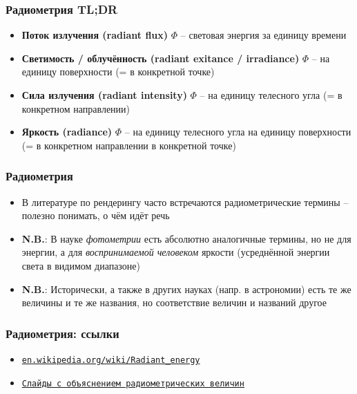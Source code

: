 \documentclass[handout,10pt]{beamer}
\begin{document}
\begin{frame}
\frametitle{Радиометрия TL;DR}
\begin{itemize}
\item \textbf{Поток излучения (radiant flux)} \begin{math}\Phi\end{math} -- световая энергия за единицу времени
\pause
\item \textbf{Светимость / облучённость (radiant exitance / irradiance)} \begin{math}\Phi\end{math} -- на единицу поверхности (= в конкретной точке)
\pause
\item \textbf{Сила излучения (radiant intensity)} \begin{math}\Phi\end{math} -- на единицу телесного угла (= в конкретном направлении)
\pause
\item \textbf{Яркость (radiance)} \begin{math}\Phi\end{math} -- на единицу телесного угла на единицу поверхности (= в конкретном направлении в конкретной точке)
\end{itemize}
\end{frame}

\begin{frame}
\frametitle{Радиометрия}
\begin{itemize}
\item В литературе по рендерингу часто встречаются радиометрические термины -- полезно понимать, о чём идёт речь
\pause
\item \textbf{\alert{N.B.}}: В науке \textit{фотометрии} есть абсолютно аналогичные термины, но не для энергии, а для \textit{воспринимаемой человеком} яркости (усреднённой энергии света в видимом диапазоне)
\pause
\item \textbf{\alert{N.B.}}: Исторически, а также в других науках (напр. в астрономии) есть те же величины и те же названия, но соответствие величин и названий другое
\end{itemize}
\end{frame}

\begin{frame}
\frametitle{Радиометрия: ссылки}
\begin{itemize}
\item \href{https://en.wikipedia.org/wiki/Radiant_energy}{\texttt{en.wikipedia.org/wiki/Radiant\_energy}}
\item \href{https://www.cs.toronto.edu/~kyros/courses/418/Lectures/lecture.2010f.10.pdf}{\texttt{Слайды с объяснением радиометрических величин}}
\end{itemize}
\end{frame}
\end{document}
